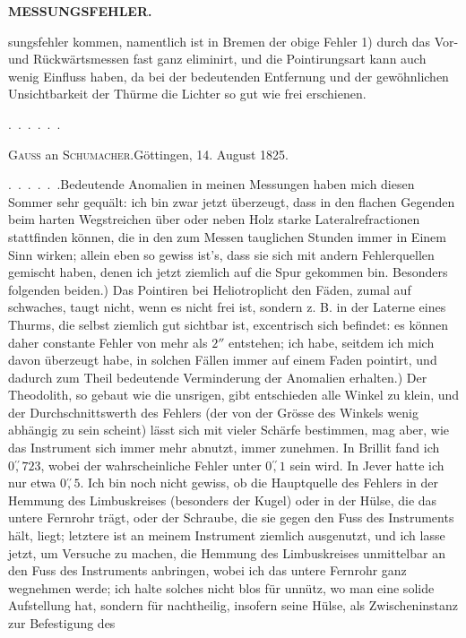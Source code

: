 \par\clearpage
\noindent\null\hfill{\small\textbf{MESSUNGSFEHLER.}}\hfill{}\par\medskip
\noindent sungsfehler kommen, namentlich ist in Bremen der obige Fehler 1) durch das Vor- und Rückwärtsmessen fast ganz eliminirt, und die Pointirungsart kann auch wenig Einfluss haben, da bei der bedeutenden Entfernung und der gewöhnlichen Unsichtbarkeit der Thürme die Lichter so gut wie frei erschienen.\par
\noindent .\ .\ .\ .\ .\ .
\begin{center}{\large\textsc{Gauss} an \textsc{Schumacher}.\quad Göttingen, 14. August 1825.}\end{center}
\par\noindent\hspace*{\parindent}.\ .\ .\ .\ .\ .\enspace Bedeutende Anomalien in meinen Messungen haben mich diesen Sommer sehr gequält: ich bin zwar jetzt überzeugt, dass in den flachen Gegenden beim harten Wegstreichen über oder neben Holz starke Lateralrefractionen stattfinden können, die in den zum Messen tauglichen Stunden immer in Einem Sinn wirken; allein eben so gewiss ist’s, dass sie sich mit andern Fehlerquellen gemischt haben, denen ich jetzt ziemlich auf die Spur gekommen bin. Besonders folgenden beiden.) Das Pointiren bei Heliotroplicht  den Fäden, zumal auf schwaches, taugt nicht, wenn es nicht frei ist, sondern z. B. in der Laterne eines Thurms, die selbst ziemlich gut sichtbar ist, excentrisch sich befindet: es können daher constante Fehler von mehr als $2''$ entstehen; ich habe, seitdem ich mich davon überzeugt habe, in solchen Fällen immer auf einem Faden pointirt, und dadurch zum Theil bedeutende Verminderung der Anomalien erhalten.) Der Theodolith, so gebaut wie die unsrigen, gibt entschieden alle Winkel zu klein, und der Durchschnittswerth des Fehlers (der von der Grösse des Winkels wenig abhängig zu sein scheint) lässt sich mit vieler Schärfe bestimmen, mag aber, wie das Instrument sich immer mehr abnutzt, immer zunehmen. In Brillit fand ich $0\overset{\prime\prime}{,}723$, wobei der wahrscheinliche Fehler unter $0\overset{\prime\prime}{,}1$ sein wird. In Jever hatte ich nur etwa $0\overset{\prime\prime}{,}5$. Ich bin noch nicht gewiss, ob die Hauptquelle des Fehlers in der Hemmung des Limbuskreises (besonders der Kugel) oder in der Hülse, die das untere Fernrohr trägt, oder der Schraube, die sie gegen den Fuss des Instruments hält, liegt; letztere ist an meinem Instrument ziemlich ausgenutzt, und ich lasse jetzt, um Versuche zu machen, die Hemmung des Limbuskreises unmittelbar an den Fuss des Instruments anbringen, wobei ich das untere Fernrohr ganz wegnehmen werde; ich halte solches nicht blos für unnütz, wo man eine solide Aufstellung hat, sondern für nachtheilig, insofern seine Hülse, als Zwischeninstanz zur Befestigung des

